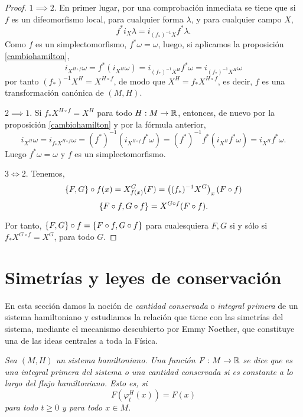 \begin{proof}

  $1\implies 2$. En primer lugar, por una comprobación inmediata se tiene que si $f$ es un difeomorfismo local, para cualquier forma $\lambda$, y para cualquier campo $X$, 
  \begin{equation*}
    f^*i_X \lambda = i_{(f_*)^{-1}X}f^* \lambda.
  \end{equation*}
  Como $f$ es un simplectomorfismo, $f^*\omega=\omega$, luego, si aplicamos la proposición \ref{cambiohamilton},
  \begin{equation*}
    i_{X^{H\circ f}}\omega=f^{*}(i_{X^H}\omega)=i_{(f_*)^{-1}X^H}f^*\omega=i_{(f_*)^{-1}X^H}\omega
  \end{equation*}
  por tanto $(f_*)^{-1}X^H=X^{H\circ f}$, de modo que $X^H=f_*X^{H\circ f}$, es decir, $f$ es una transformación canónica de $(M,H)$.

  $2\implies 1$. Si $f_*X^{H\circ f}=X^H$ para todo $H:M \rightarrow \mathbb{R}$, entonces, de nuevo por la proposición \ref{cambiohamilton} y por la fórmula anterior,
  \begin{equation*}
    i_{X^H}\omega=i_{f_*X^{H\circ f}}\omega = (f^*)^{-1}(i_{X^{H\circ f}}f^*\omega)=(f^*)^{-1}f^*(i_{X^H}f^*\omega)=i_{X^H}f^*\omega.
  \end{equation*}
  Luego $f^* \omega = \omega$ y $f$ es un simplectomorfismo.

  $3\Longleftrightarrow 2$. Tenemos,
  \begin{align*}
    \left\lbrace F,G\right\rbrace\circ f(x)=X^G_{f(x)}(F)=\left( (f_{*})^{-1}X^G \right)_x(F\circ f)
  \end{align*}
  \begin{equation*}
    \left\lbrace F\circ f,G \circ f\right\rbrace = X^{G\circ f}(F \circ f).
  \end{equation*}

  Por tanto, $\left\lbrace F,G\right\rbrace \circ f=\left\lbrace F\circ f,G \circ f\right\rbrace$ para cualesquiera $F,G$ si y sólo si $f_*X^{G \circ f}= X^{G}$, para todo $G$.
\end{proof}

\section{Simetrías y leyes de conservación}
En esta sección damos la noción de \emph{cantidad conservada} o \emph{integral primera} de un sistema hamiltoniano y estudiamos la relación que tiene con las simetrías del sistema, mediante el mecanismo descubierto por Emmy Noether, que constituye una de las ideas centrales a toda la Física.
\begin{defn}
  \em
  Sea $(M,H)$ un sistema hamiltoniano. Una función $F:M \rightarrow \mathbb{R}$ se dice que es una \emph{integral primera} del sistema o una \emph{cantidad conservada} si es constante a lo largo del flujo hamiltoniano. Esto es, si
  \begin{equation*}
    F(\varphi^H_t(x))=F(x)
  \end{equation*}
  para todo $t \geq 0$ y para todo $x \in M$.
\end{defn}

